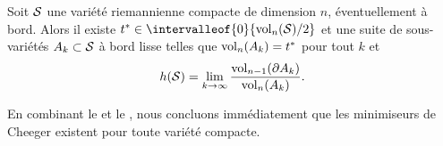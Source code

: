 \begin{lemme} \label{lemme:buser}
Soit $\mathcal{S}$ une variété riemannienne compacte de dimension $n$, éventuellement à bord. Alors il existe $t^\ast \in \intervalleof{0}{\vol_n(\surflisse)/2}$ et une suite de sous-variétés $A_k \subset \mathcal{S}$ à bord lisse telles que $\operatorname{vol}_n(A_k) = t^\ast$ pour tout $k$ et
\[
h(\mathcal{S}) = \lim_{k \to \infty} \frac{\operatorname{vol}_{n-1}(\partial A_k)}{\operatorname{vol}_n(A_k)}.
\]
\end{lemme}
En combinant le  et le , nous concluons immédiatement que les minimiseurs de Cheeger existent pour toute variété compacte.